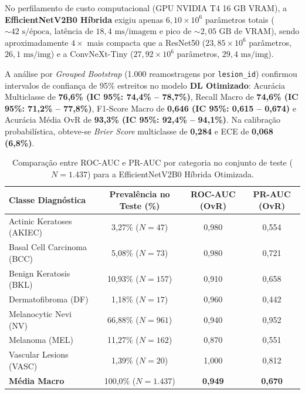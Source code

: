 \documentclass[12pt,a4paper]{article}
\begin{document}
No perfilamento de custo computacional (GPU NVIDIA T4 16 GB VRAM), a \textbf{EfficientNetV2B0 Híbrida} exigiu apenas $6{,}10 \times 10^6$ parâmetros totais ($\sim 42\text{ s/época}$, latência de $18{,}4\text{ ms/imagem}$ e pico de $\sim 2{,}05\text{ GB}$ de VRAM), sendo aproximadamente $4\times$ mais compacta que a ResNet50 ($23{,}85 \times 10^6$ parâmetros, $26{,}1\text{ ms/img}$) e a ConvNeXt-Tiny ($27{,}92 \times 10^6$ parâmetros, $29{,}4\text{ ms/img}$).

A análise por \textit{Grouped Bootstrap} (1.000 reamostragens por \texttt{lesion\_id}) confirmou intervalos de confiança de 95\% estreitos no modelo \textbf{DL Otimizado}: Acurácia Multiclasse de \textbf{76,6\% (IC 95\%: 74,4\% -- 78,7\%)}, Recall Macro de \textbf{74,6\% (IC 95\%: 71,2\% -- 77,8\%)}, F1-Score Macro de \textbf{0,646 (IC 95\%: 0,615 -- 0,674)} e Acurácia Média OvR de \textbf{93,3\% (IC 95\%: 92,4\% -- 94,1\%)}. Na calibração probabilística, obteve-se \textit{Brier Score} multiclasse de \textbf{0,284} e ECE de \textbf{0,068 (6,8\%)}.

\begin{table}[htbp]
\centering
\small
\caption{Comparação entre ROC-AUC e PR-AUC por categoria no conjunto de teste ($N=1.437$) para a EfficientNetV2B0 Híbrida Otimizada.}
\label{tab:auc_detalhado}
\vspace{0.4em}
\begin{tabularx}{0.88\textwidth}{Xccc}
\toprule
\textbf{Classe Diagnóstica} & \textbf{Prevalência no Teste (\%)} & \textbf{ROC-AUC (OvR)} & \textbf{PR-AUC (OvR)} \\
\midrule
Actinic Keratoses (AKIEC) & 3,27\% ($N=47$) & 0,980 & 0,554 \\
Basal Cell Carcinoma (BCC) & 5,08\% ($N=73$) & 0,980 & 0,721 \\
Benign Keratosis (BKL) & 10,93\% ($N=157$) & 0,910 & 0,658 \\
Dermatofibroma (DF) & 1,18\% ($N=17$) & 0,960 & 0,442 \\
Melanocytic Nevi (NV) & 66,88\% ($N=961$) & 0,940 & 0,952 \\
Melanoma (MEL) & 11,27\% ($N=162$) & 0,870 & 0,551 \\
Vascular Lesions (VASC) & 1,39\% ($N=20$) & 1,000 & 0,812 \\
\midrule
\textbf{Média Macro} & 100,0\% ($N=1.437$) & \textbf{0,949} & \textbf{0,670} \\
\bottomrule
\end{tabularx}
\end{table}
\end{document}

